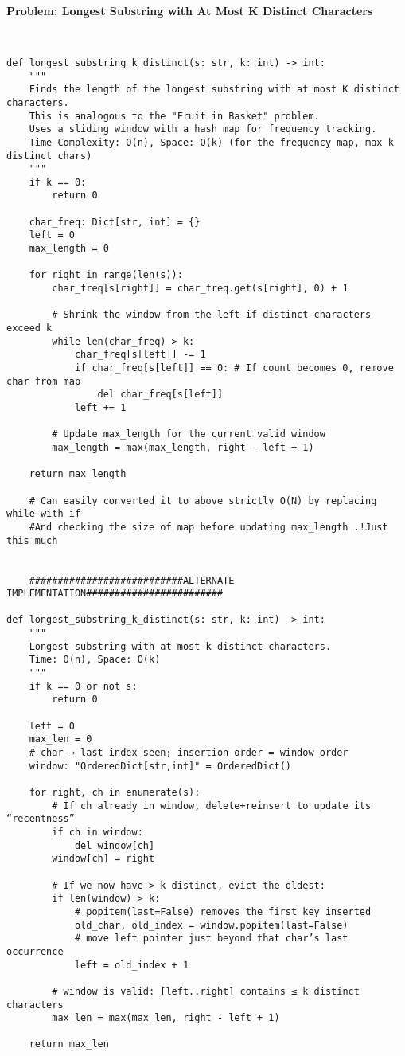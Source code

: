 \noindent\textbf{Problem: Longest Substring with At Most K Distinct Characters}
\begin{verbatim}


def longest_substring_k_distinct(s: str, k: int) -> int:
    """
    Finds the length of the longest substring with at most K distinct characters.
    This is analogous to the "Fruit in Basket" problem. 
    Uses a sliding window with a hash map for frequency tracking. 
    Time Complexity: O(n), Space: O(k) (for the frequency map, max k distinct chars)
    """
    if k == 0:
        return 0
    
    char_freq: Dict[str, int] = {}
    left = 0
    max_length = 0

    for right in range(len(s)):
        char_freq[s[right]] = char_freq.get(s[right], 0) + 1
        
        # Shrink the window from the left if distinct characters exceed k
        while len(char_freq) > k:
            char_freq[s[left]] -= 1
            if char_freq[s[left]] == 0: # If count becomes 0, remove char from map
                del char_freq[s[left]]
            left += 1
        
        # Update max_length for the current valid window
        max_length = max(max_length, right - left + 1)
        
    return max_length

    # Can easily converted it to above strictly O(N) by replacing while with if
    #And checking the size of map before updating max_length .!Just this much


    ###########################ALTERNATE IMPLEMENTATION########################

def longest_substring_k_distinct(s: str, k: int) -> int:
    """
    Longest substring with at most k distinct characters.
    Time: O(n), Space: O(k)
    """
    if k == 0 or not s:
        return 0

    left = 0
    max_len = 0
    # char → last index seen; insertion order = window order
    window: "OrderedDict[str,int]" = OrderedDict()

    for right, ch in enumerate(s):
        # If ch already in window, delete+reinsert to update its “recentness”
        if ch in window:
            del window[ch]
        window[ch] = right

        # If we now have > k distinct, evict the oldest:
        if len(window) > k:
            # popitem(last=False) removes the first key inserted
            old_char, old_index = window.popitem(last=False)
            # move left pointer just beyond that char’s last occurrence
            left = old_index + 1

        # window is valid: [left..right] contains ≤ k distinct characters
        max_len = max(max_len, right - left + 1)

    return max_len

\end{verbatim}

